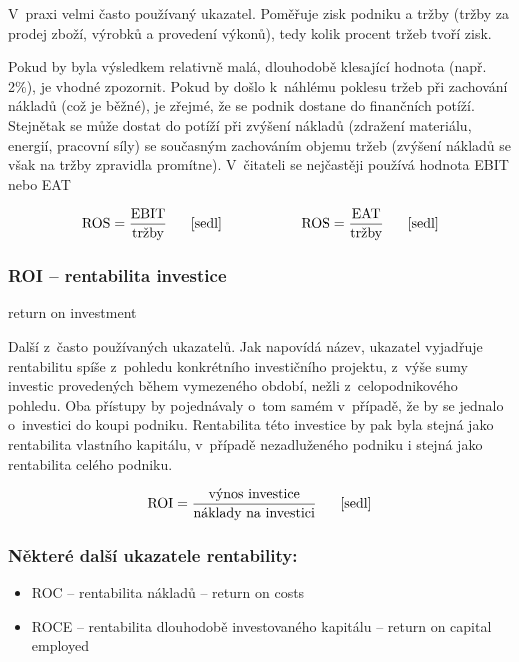 V~praxi velmi často používaný ukazatel. Poměřuje zisk podniku a tržby (tržby za prodej zboží, výrobků a provedení výkonů), tedy kolik procent tržeb tvoří zisk.

Pokud by byla výsledkem relativně malá, dlouhodobě klesající hodnota (např. 2\%), je vhodné zpozornit. Pokud by došlo k~náhlému poklesu tržeb při zachování nákladů (což je běžné), je zřejmé, že se podnik dostane do finančních potíží. Stejnětak se může dostat do potíží při zvýšení nákladů (zdražení materiálu, energií, pracovní síly) se současným zachováním objemu tržeb (zvýšení nákladů se však na tržby zpravidla promítne). 
V~čitateli se nejčastěji používá hodnota EBIT nebo EAT

$$\vz{ROS}{EBIT}{tržby} \scite{sedl} \hspace{2cm} \vz{ROS}{EAT}{tržby} \scite{sedl}$$ 



\subsubsection{ROI -- rentabilita investice}
return on investment

Další z~často používaných ukazatelů. Jak napovídá název, ukazatel vyjadřuje rentabilitu spíše z~pohledu konkrétního investičního projektu, z~výše sumy investic provedených během vymezeného období, nežli z~celopodnikového pohledu. Oba přístupy by pojednávaly o~tom samém v~případě, že by se jednalo o~investici do koupi podniku. Rentabilita této investice by pak byla stejná jako rentabilita vlastního kapitálu, v~případě nezadluženého podniku i stejná jako rentabilita celého podniku.

$$\vz{ROI}{výnos investice}{náklady na investici} \scite{sedl} $$ 

\subsubsection{Některé další ukazatele rentability:}
\begin{itemize}
\item{ROC -- rentabilita nákladů} -- return on costs
\item{ROCE -- rentabilita dlouhodobě investovaného kapitálu} -- return on capital employed
\end{itemize}







